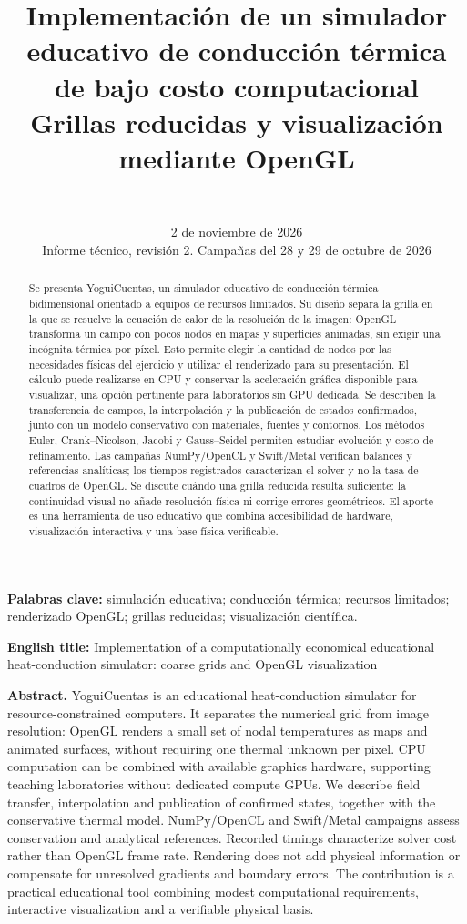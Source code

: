 \documentclass[11pt,a4paper]{article}
\title{Implementación de un simulador educativo de conducción térmica de bajo costo computacional\\[2mm]\large Grillas reducidas y visualización mediante OpenGL}
\author{\autores\\[2mm]\small\afiliacion}
\date{2 de noviembre de 2026\\\small Informe técnico, revisión 2. Campañas del 28 y 29 de octubre de 2026}
\begin{document}
\maketitle
\begin{abstract}
Se presenta YoguiCuentas, un simulador educativo de conducción térmica bidimensional orientado a equipos de recursos limitados. Su diseño separa la grilla en la que se resuelve la ecuación de calor de la resolución de la imagen: OpenGL transforma un campo con pocos nodos en mapas y superficies animadas, sin exigir una incógnita térmica por píxel. Esto permite elegir la cantidad de nodos por las necesidades físicas del ejercicio y utilizar el renderizado para su presentación. El cálculo puede realizarse en CPU y conservar la aceleración gráfica disponible para visualizar, una opción pertinente para laboratorios sin GPU dedicada. Se describen la transferencia de campos, la interpolación y la publicación de estados confirmados, junto con un modelo conservativo con materiales, fuentes y contornos. Los métodos Euler, Crank--Nicolson, Jacobi y Gauss--Seidel permiten estudiar evolución y costo de refinamiento. Las campañas NumPy/OpenCL y Swift/Metal verifican balances y referencias analíticas; los tiempos registrados caracterizan el solver y no la tasa de cuadros de OpenGL. Se discute cuándo una grilla reducida resulta suficiente: la continuidad visual no añade resolución física ni corrige errores geométricos. El aporte es una herramienta de uso educativo que combina accesibilidad de hardware, visualización interactiva y una base física verificable.
\end{abstract}
\noindent\textbf{Palabras clave:} simulación educativa; conducción térmica; recursos limitados; renderizado OpenGL; grillas reducidas; visualización científica.

\begin{center}\textbf{English title:} Implementation of a computationally economical educational heat-conduction simulator: coarse grids and OpenGL visualization\end{center}
\noindent\textbf{Abstract.} YoguiCuentas is an educational heat-conduction simulator for resource-constrained computers. It separates the numerical grid from image resolution: OpenGL renders a small set of nodal temperatures as maps and animated surfaces, without requiring one thermal unknown per pixel. CPU computation can be combined with available graphics hardware, supporting teaching laboratories without dedicated compute GPUs. We describe field transfer, interpolation and publication of confirmed states, together with the conservative thermal model. NumPy/OpenCL and Swift/Metal campaigns assess conservation and analytical references. Recorded timings characterize solver cost rather than OpenGL frame rate. Rendering does not add physical information or compensate for unresolved gradients and boundary errors. The contribution is a practical educational tool combining modest computational requirements, interactive visualization and a verifiable physical basis.
\end{document}
